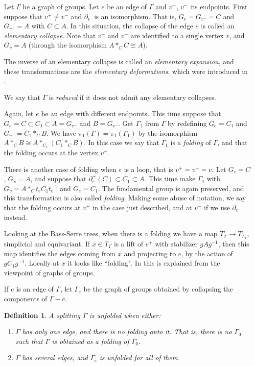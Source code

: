 \documentclass[12pt]{amsart}
\newtheorem{definition}[theorem]{Definition}
\begin{document}
Let $\Gamma$ be a graph of groups. Let $e$ be an edge of $\Gamma$ and $v^+$, $v^-$ its endpoints.
First suppose that $v^+ \neq v^-$ and $\partial^-_e$ is an isomorphism. That is, $G_e = G_{v^-} = C$ and $G_{v^+} = A$ with $C\subset A$.
In this situation, the collapse of the edge $e$ is called an {\em elementary collapse}. Note that $v^+$ and $v^-$ are identified to a single vertex $\bar v$, and $G_{\bar v}= A$ (through the isomorphism $A*_C C\cong A$).

The inverse of an elementary collapse is called an {\em elementary expansion}, and these transformations are the {\em elementary deformations}, which were introduced in \cite{forester2}.

We say that $\Gamma$ is {\em reduced} if it does not admit any elementary collapses.


Again, let $e$ be an edge with different endpoints. This time suppose that $G_e = C \subset C_1 \subset A = G_{v^+}$ and $B=G_{v^-}$. Get $\Gamma_1$ from $\Gamma$ by redefining $G_e = C_1$ and $G_{v^-}=C_1*_C B$. We have $\pi_1(\Gamma)=\pi_1(\Gamma_1)$ by the isomorphism $A*_C B \cong A*_{C_1}(C_1*_C B)$. In this case we say that $\Gamma_1$ is a {\em folding} of $\Gamma$, and that the folding occurs at the vertex $v^+$.

There is another case of folding when $e$ is a loop, that is $v^+ = v^- = v$. Let $G_e=C$, $G_v = A$, and suppose that $\partial^+_e(C)\subset C_1 \subset A$. This time make $\Gamma_1$ with $G_v = A*_C t_e C_1t_e^{-1}$ and $G_e = C_1$. The fundamental group is again preserved, and this transformation is also called {\em folding}. Making some abuse of notation, we say that the folding occurs at $v^+$ in the case just described, and at $v^-$ if we use $\partial^-_e$ instead. 

Looking at the Bass-Serre trees, when there is a folding we have a map $T_{\Gamma} \to T_{\Gamma_1}$, simplicial and equivariant. If $x\in T_{\Gamma}$ is a lift of $v^+$ with stabilizer $gAg^{-1}$, then this map identifies the edges coming from $x$ and projecting to $e$, by the action of $gC_1g^{-1}$. Locally at $x$ it looks like ``folding". In \cite{bestv} this is explained from the viewpoint of graphs of groups.

If $e$ is an edge of $\Gamma$, let $\Gamma_e$ be the graph of groups obtained by collapsing the components of $\Gamma-e$.

\begin{definition} A splitting $\Gamma$ is {\em unfolded} when either:
\begin{enumerate}
\item $\Gamma$ has only one edge, and there is no folding onto it. That is, there is no $\Gamma_0$ such that $\Gamma$ is obtained as a folding of $\Gamma_0$. 
\item $\Gamma$ has several edges, and $\Gamma_e$ is unfolded for all of them.
\end{enumerate}
\end{definition}
\end{document}
